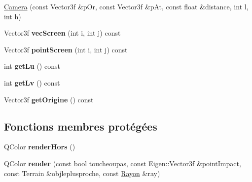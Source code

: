 \begin{DoxyCompactItemize}
\item 
\hyperlink{class_camera_a073a52c602bcad47cd77c11215d884eb}{Camera} (const Vector3f \&p\+Or, const Vector3f \&p\+At, const float \&distance, int l, int h)
\item 
\hypertarget{class_camera_a280e83aa370deae3f80ab7a9c010fe34}{}Vector3f {\bfseries vec\+Screen} (int i, int j) const \label{class_camera_a280e83aa370deae3f80ab7a9c010fe34}

\item 
\hypertarget{class_camera_ad725f4860f70e5b32388c3bc8e146fbf}{}Vector3f {\bfseries point\+Screen} (int i, int j) const \label{class_camera_ad725f4860f70e5b32388c3bc8e146fbf}

\item 
\hypertarget{class_camera_a136044c6daf6dfd8617f1ed4d17db265}{}int {\bfseries get\+Lu} () const \label{class_camera_a136044c6daf6dfd8617f1ed4d17db265}

\item 
\hypertarget{class_camera_af22f296bdbe6b3705771ba8223d6bb3d}{}int {\bfseries get\+Lv} () const \label{class_camera_af22f296bdbe6b3705771ba8223d6bb3d}

\item 
\hypertarget{class_camera_a1e409a80ecbf59b62aa47e5759c0be9f}{}Vector3f {\bfseries get\+Origine} () const \label{class_camera_a1e409a80ecbf59b62aa47e5759c0be9f}

\end{DoxyCompactItemize}
\subsection*{Fonctions membres protégées}
\begin{DoxyCompactItemize}
\item 
\hypertarget{class_camera_a4f4834b66b9dee74cc368156956afc2a}{}Q\+Color {\bfseries render\+Hors} ()\label{class_camera_a4f4834b66b9dee74cc368156956afc2a}

\item 
\hypertarget{class_camera_acf88b7572e5963d5deba3fdfeae71afd}{}Q\+Color {\bfseries render} (const bool toucheoupas, const Eigen\+::\+Vector3f \&point\+Impact, const Terrain \&objleplusproche, const \hyperlink{class_rayon}{Rayon} \&ray)\label{class_camera_acf88b7572e5963d5deba3fdfeae71afd}

\end{DoxyCompactItemize}
